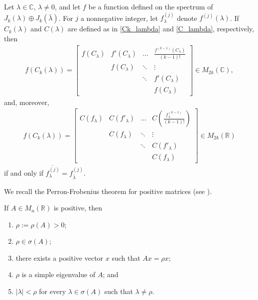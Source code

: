 \documentclass[10pt,twoside,leqno]{siamltex}
\begin{document}
\begin{proposition} \label{prop:rjcf_cor} 
Let $\lambda \in {\mathbb{{C}}}$, $\lambda \neq 0$, and let $f$ be a function defined on the spectrum of ${J_{{k}}{\left( {\lambda} \right)}} \oplus {J_{{k}}{\left( {\bar{\lambda}} \right)}}$.  For $j$ a nonnegative integer, let $f^{(j)}_\lambda$ denote $f^{(j)}(\lambda)$. If $C_k (\lambda)$ and $C(\lambda)$ are defined as in \eqref{Ck_lambda} and \eqref{C_lambda}, respectively, then
\begin{align*} 
f(C_{k} (\lambda)) = 
\begin{bmatrix} 
f(C_\lambda) & f'(C_\lambda) & \dots   & \frac{f^{(k-1)}(C_\lambda)}{(k-1)!}  	\\
		 & f(C_\lambda) & \ddots & \vdots 					\\
		 & 		     & \ddots & f'(C_\lambda)				\\
		 & 		     & 	         & f(C_\lambda)
\end{bmatrix} \in {M_{{2k}}({{\mathbb{{C}}}})},
\end{align*}
and, moreover, 
\begin{align*} 
f ( C_{k} (\lambda) ) = 
\begin{bmatrix} 
C(f_\lambda) & C(f'_\lambda) & \dots & C \left( \frac{f^{(k-1)}_\lambda}{(k-1)!} \right)	\\
& C(f_\lambda) & \ddots & \vdots 									\\
& & \ddots & C(f'_\lambda) 										\\
& & & C(f_\lambda)
\end{bmatrix} \in {M_{{2k}}({{\mathbb{{R}}}})}
\end{align*}
if and only if $\overline{f_\lambda^{(j)}} = f_{\bar{\lambda}}^{(j)}$.
\end{proposition}

We recall the Perron-Frobenius theorem for positive matrices (see \cite[Theorem 8.2.11]{hj1990}).

\begin{theorem} \label{thm:pf} 
If $A \in {M_{{n}}({{\mathbb{{R}}}})}$ is positive, then 
\begin{enumerate}[label=(\roman*)]
\item $\rho := {\rho\left({A}\right)} > 0$;
\item $\rho \in {\sigma \left( {A} \right)}$;
\item there exists a positive vector $x$ such that $Ax = \rho x$;
\item $\rho$ is a simple eigenvalue of $A$; and 
\item $|\lambda| < \rho$ for every $\lambda \in {\sigma \left( {A} \right)}$ such that $\lambda \neq \rho$. 
\end{enumerate}
\end{theorem}
\end{document}
